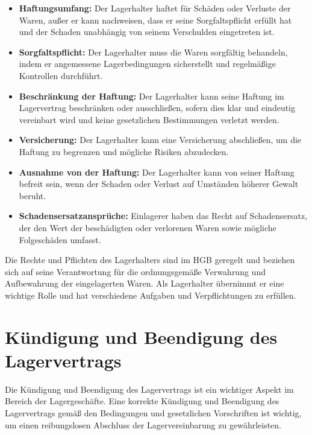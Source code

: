 \begin{itemize}
    \item \textbf{Haftungsumfang:} Der Lagerhalter haftet für Schäden oder Verluste der Waren, außer er kann nachweisen, dass er seine Sorgfaltspflicht erfüllt hat und der Schaden unabhängig von seinem Verschulden eingetreten ist.
    \item \textbf{Sorgfaltspflicht:} Der Lagerhalter muss die Waren sorgfältig behandeln, indem er angemessene Lagerbedingungen sicherstellt und regelmäßige Kontrollen durchführt.
    \item \textbf{Beschränkung der Haftung:} Der Lagerhalter kann seine Haftung im Lagervertrag beschränken oder ausschließen, sofern dies klar und eindeutig vereinbart wird und keine gesetzlichen Bestimmungen verletzt werden.
    \item \textbf{Versicherung:} Der Lagerhalter kann eine Versicherung abschließen, um die Haftung zu begrenzen und mögliche Risiken abzudecken.
    \item \textbf{Ausnahme von der Haftung:} Der Lagerhalter kann von seiner Haftung befreit sein, wenn der Schaden oder Verlust auf Umständen höherer Gewalt beruht.
    \item \textbf{Schadensersatzansprüche:} Einlagerer haben das Recht auf Schadensersatz, der den Wert der beschädigten oder verlorenen Waren sowie mögliche Folgeschäden umfasst.
\end{itemize}

Die Rechte und Pflichten des Lagerhalters sind im \ac{HGB} geregelt und beziehen sich auf seine Verantwortung für die ordnungsgemäße Verwahrung und Aufbewahrung der eingelagerten Waren. Als Lagerhalter übernimmt er eine wichtige Rolle und hat verschiedene Aufgaben und Verpflichtungen zu erfüllen.

\section{Kündigung und Beendigung des Lagervertrags}
Die Kündigung und Beendigung des Lagervertrags ist ein wichtiger Aspekt im Bereich der Lagergeschäfte. Eine korrekte Kündigung und Beendigung des Lagervertrags gemäß den Bedingungen und gesetzlichen Vorschriften ist wichtig, um einen reibungslosen Abschluss der Lagervereinbarung zu gewährleisten.

